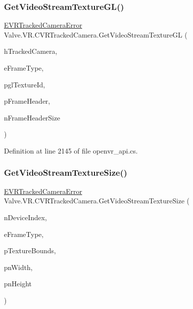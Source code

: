 \subsubsection{\texorpdfstring{GetVideoStreamTextureGL()}{GetVideoStreamTextureGL()}}
{\footnotesize\ttfamily \mbox{\hyperlink{namespace_valve_1_1_v_r_ad0e012e846f5d93848783c044614cfd3}{E\+V\+R\+Tracked\+Camera\+Error}} Valve.\+V\+R.\+C\+V\+R\+Tracked\+Camera.\+Get\+Video\+Stream\+Texture\+GL (\begin{DoxyParamCaption}\item[{ulong}]{h\+Tracked\+Camera,  }\item[{\mbox{\hyperlink{namespace_valve_1_1_v_r_a9962211bc3fe98c2683db188c12c9afd}{E\+V\+R\+Tracked\+Camera\+Frame\+Type}}}]{e\+Frame\+Type,  }\item[{ref uint}]{pgl\+Texture\+Id,  }\item[{ref \mbox{\hyperlink{struct_valve_1_1_v_r_1_1_camera_video_stream_frame_header__t}{Camera\+Video\+Stream\+Frame\+Header\+\_\+t}}}]{p\+Frame\+Header,  }\item[{uint}]{n\+Frame\+Header\+Size }\end{DoxyParamCaption})}



Definition at line 2145 of file openvr\+\_\+api.\+cs.

\mbox{\label{class_valve_1_1_v_r_1_1_c_v_r_tracked_camera_a8edfe35e16e786063cf5749899751d8a}} 
\subsubsection{\texorpdfstring{GetVideoStreamTextureSize()}{GetVideoStreamTextureSize()}}
{\footnotesize\ttfamily \mbox{\hyperlink{namespace_valve_1_1_v_r_ad0e012e846f5d93848783c044614cfd3}{E\+V\+R\+Tracked\+Camera\+Error}} Valve.\+V\+R.\+C\+V\+R\+Tracked\+Camera.\+Get\+Video\+Stream\+Texture\+Size (\begin{DoxyParamCaption}\item[{uint}]{n\+Device\+Index,  }\item[{\mbox{\hyperlink{namespace_valve_1_1_v_r_a9962211bc3fe98c2683db188c12c9afd}{E\+V\+R\+Tracked\+Camera\+Frame\+Type}}}]{e\+Frame\+Type,  }\item[{ref \mbox{\hyperlink{struct_valve_1_1_v_r_1_1_v_r_texture_bounds__t}{V\+R\+Texture\+Bounds\+\_\+t}}}]{p\+Texture\+Bounds,  }\item[{ref uint}]{pn\+Width,  }\item[{ref uint}]{pn\+Height }\end{DoxyParamCaption})}



